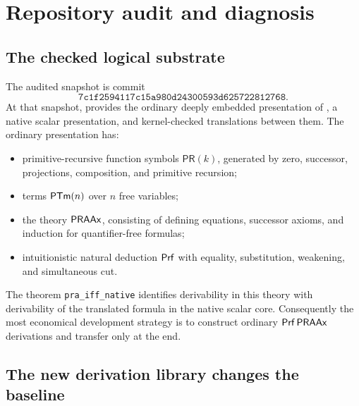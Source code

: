 \section{Repository audit and diagnosis}\label{sec:audit}

\subsection{The checked logical substrate}

The audited snapshot is commit
\[
\texttt{7c1f2594117c15a980d24300593d625722812768}.
\]
At that snapshot,  provides the ordinary deeply embedded presentation of \iPRA, a native scalar presentation, and kernel-checked translations between them.  The ordinary presentation has:
\begin{itemize}
  \item primitive-recursive function symbols \(\mathsf{PR}(k)\), generated by zero, successor, projections, composition, and primitive recursion;
  \item terms \(\mathsf{PTm}(n)\) over \(n\) free variables;
  \item the theory \(\mathsf{PRAAx}\), consisting of defining equations, successor axioms, and induction for quantifier-free formulas;
  \item intuitionistic natural deduction \(\mathsf{Prf}\) with equality, substitution, weakening, and simultaneous cut.
\end{itemize}
The theorem \texttt{pra\_iff\_native} identifies derivability in this theory with derivability of the translated formula in the native scalar core.  Consequently the most economical development strategy is to construct ordinary \(\mathsf{Prf}\,\mathsf{PRAAx}\) derivations and transfer only at the end.

\subsection{The new derivation library changes the baseline}

